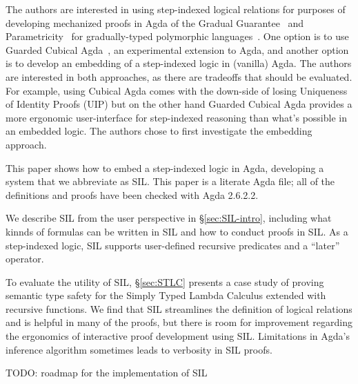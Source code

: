 \documentclass[acmsmall]{acmart}
\newcommand{\app}{\,}
\begin{document}
The authors are interested in using step-indexed logical relations for
purposes of developing mechanized proofs in Agda of the Gradual
Guarantee~\citep{Siek:2015ac} and Parametricity~\citep{REYNOLDS74C}
for gradually-typed polymorphic
languages~\citep{Ahmed:2011fk,Ahmed:2017aa,Igarashi:2017aa,New:2019ab,Labrada:2020tk}.
One option is to use Guarded Cubical Agda~\citep{Veltri:2020aa}, an
experimental extension to Agda, and another option is to develop an
embedding of a step-indexed logic in (vanilla) Agda. The authors are
interested in both approaches, as there are tradeoffs that should be
evaluated. For example, using Cubical Agda comes with the down-side of
losing Uniqueness of Identity Proofs (UIP) but on the other hand
Guarded Cubical Agda provides a more ergonomic user-interface for
step-indexed reasoning than what's possible in an embedded logic. The
authors chose to first investigate the embedding approach.

This paper shows how to embed a step-indexed logic in Agda, developing
a system that we abbreviate as SIL. This paper is a literate Agda
file; all of the definitions and proofs have been checked with Agda
2.6.2.2.

We describe SIL from the user perspective in
§\ref{sec:SIL-intro}, including what kinnds of formulas can be
written in SIL and how to conduct proofs in SIL. As a step-indexed
logic, SIL supports user-defined recursive predicates and a ``later''
operator.


To evaluate the utility of SIL, §\ref{sec:STLC} presents a case
study of proving semantic type safety for the Simply Typed Lambda
Calculus extended with recursive functions. We find that SIL
streamlines the definition of logical relations and is helpful in many
of the proofs, but there is room for improvement regarding the
ergonomics of interactive proof development using SIL.  Limitations in
Agda's inference algorithm sometimes leads to verbosity in SIL proofs.

TODO: roadmap for the implementation of SIL
\end{document}
